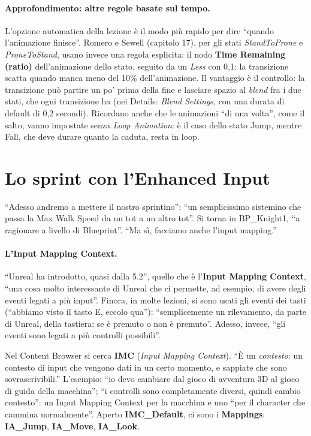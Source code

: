 \paragraph{Approfondimento: altre regole basate sul tempo.} L'opzione automatica della
lezione è il modo più rapido per dire ``quando l'animazione finisce''. Romero e Sewell
(capitolo 17), per gli stati \emph{StandToProne} e \emph{ProneToStand}, usano invece una
regola esplicita: il nodo \textbf{Time Remaining (ratio)} dell'animazione dello stato,
seguito da un \emph{Less} con 0,1: la transizione scatta quando manca meno del 10\%
dell'animazione. Il vantaggio è il controllo: la transizione può partire un po' prima
della fine e lasciare spazio al \emph{blend} fra i due stati, che ogni transizione ha
(nei Details: \emph{Blend Settings}, con una durata di default di 0,2 secondi).
Ricordano anche che le animazioni ``di una volta'', come il salto, vanno impostate senza
\emph{Loop Animation}: è il caso dello stato Jump, mentre Fall, che deve durare quanto
la caduta, resta in loop.

\section{Lo sprint con l'Enhanced Input}
\label{ue9:sec:enhanced}

``Adesso andremo a mettere il nostro sprintino'': ``un semplicissimo sistemino che passa
la Max Walk Speed da un tot a un altro tot''. Si torna in BP\_Knight1, ``a ragionare a
livello di Blueprint''. ``Ma sì, facciamo anche l'input mapping.''

\paragraph{L'Input Mapping Context.} ``Unreal ha introdotto, quasi dalla 5.2'', quello
che è l'\textbf{Input Mapping Context}, ``una cosa molto interessante di Unreal che ci
permette, ad esempio, di avere degli eventi legati a più input''. Finora, in molte
lezioni, si sono usati gli eventi dei tasti (``abbiamo visto il tasto E, eccolo qua''):
``semplicemente un rilevamento, da parte di Unreal, della tastiera: se è premuto o non è
premuto''. Adesso, invece, ``gli eventi sono legati a più controlli possibili''.

Nel Content Browser si cerca \textbf{IMC} (\emph{Input Mapping Context}). ``È un
\emph{contesto}: un contesto di input che vengono dati in un certo momento, e sappiate
che sono sovrascrivibili.'' L'esempio: ``io devo cambiare dal gioco di avventura 3D al
gioco di guida della macchina''; ``i controlli sono completamente diversi, quindi cambio
contesto'': un Input Mapping Context per la macchina e uno ``per il character che cammina
normalmente''. Aperto \textbf{IMC\_Default}, ci sono i \textbf{Mappings}:
\textbf{IA\_Jump}, \textbf{IA\_Move}, \textbf{IA\_Look}.


